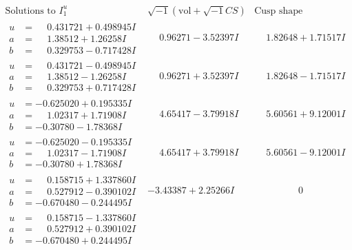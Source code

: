 \documentclass[1p]{elsarticle_modified}
\theoremstyle{definition}
\newcommand{\I}{\sqrt{-1}}
\begin{document}
$$\begin{array}{c|c|c}
 \end{array}$$\newpage$$\begin{array}{c|c|c}  
\text{Solutions to }I^u_{1}& \I (\text{vol} + \sqrt{-1}CS) & \text{Cusp shape}\\
 \hline 
\begin{aligned}
u &= \phantom{-}0.431721 + 0.498945 I \\
a &= \phantom{-}1.38512 + 1.26258 I \\
b &= \phantom{-}0.329753 - 0.717428 I\end{aligned}
 & \phantom{-}0.96271 - 3.52397 I & \phantom{-}1.82648 + 1.71517 I \\ \hline\begin{aligned}
u &= \phantom{-}0.431721 - 0.498945 I \\
a &= \phantom{-}1.38512 - 1.26258 I \\
b &= \phantom{-}0.329753 + 0.717428 I\end{aligned}
 & \phantom{-}0.96271 + 3.52397 I & \phantom{-}1.82648 - 1.71517 I \\ \hline\begin{aligned}
u &= -0.625020 + 0.195335 I \\
a &= \phantom{-}1.02317 + 1.71908 I \\
b &= -0.30780 - 1.78368 I\end{aligned}
 & \phantom{-}4.65417 - 3.79918 I & \phantom{-}5.60561 + 9.12001 I \\ \hline\begin{aligned}
u &= -0.625020 - 0.195335 I \\
a &= \phantom{-}1.02317 - 1.71908 I \\
b &= -0.30780 + 1.78368 I\end{aligned}
 & \phantom{-}4.65417 + 3.79918 I & \phantom{-}5.60561 - 9.12001 I \\ \hline\begin{aligned}
u &= \phantom{-}0.158715 + 1.337860 I \\
a &= \phantom{-}0.527912 - 0.390102 I \\
b &= -0.670480 - 0.244495 I\end{aligned}
 & -3.43387 + 2.25266 I & \phantom{-0.000000 } 0 \\ \hline\begin{aligned}
u &= \phantom{-}0.158715 - 1.337860 I \\
a &= \phantom{-}0.527912 + 0.390102 I \\
b &= -0.670480 + 0.244495 I\end{aligned}

\end{array}$$
\end{document}
